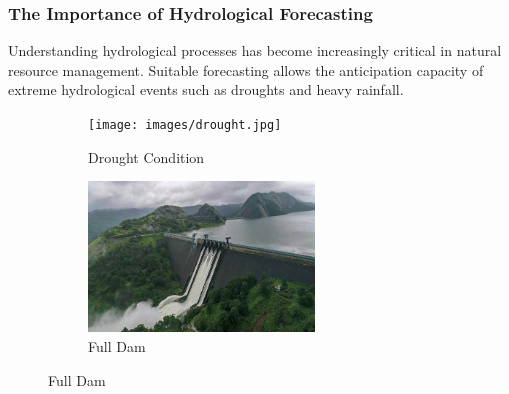 \begin{frame}
	\frametitle{The Importance of Hydrological Forecasting}
	\begin{block}{}
	Understanding hydrological processes has become increasingly critical in natural resource management. Suitable forecasting allows the anticipation capacity of extreme hydrological events such as droughts and heavy rainfall.
	\end{block}
	\begin{figure}
		\centering
		\begin{subfigure}[b]{0.45\textwidth}
			\centering
			\texttt{[image: images/drought.jpg]}
			\caption{Drought Condition}
		\end{subfigure}
		\hfill
		\begin{subfigure}[b]{0.45\textwidth}
			\centering
			\includegraphics[width=\textwidth, height=4cm]{images/full_dam.jpg}
			\caption{Full Dam}
		\end{subfigure}
	\end{figure}
	
\end{frame}

